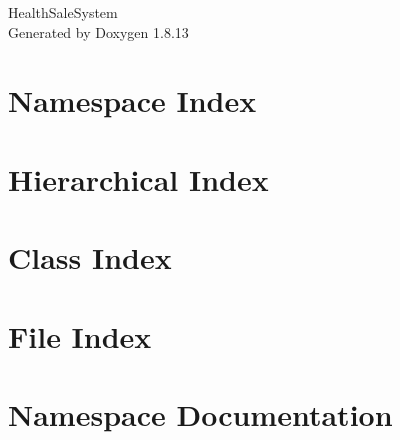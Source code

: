 \documentclass[twoside]{book}
\newcommand{\+}{\discretionary{\mbox{\scriptsize$\hookleftarrow$}}{}{}}
\newcommand{\clearemptydoublepage}{%
  \newpage{\pagestyle{empty}\cleardoublepage}%
}
\begin{document}
\hypersetup{pageanchor=false,
             bookmarksnumbered=true,
             pdfencoding=unicode
            }
\begin{titlepage}
\vspace*{7cm}
\begin{center}%
{\Large Health\+Sale\+System }\\
\vspace*{1cm}
{\large Generated by Doxygen 1.8.13}\\
\end{center}
\end{titlepage}
\clearemptydoublepage
{}
\tableofcontents
\clearemptydoublepage
{}
\hypersetup{pageanchor=true}

\chapter{Namespace Index}

\chapter{Hierarchical Index}

\chapter{Class Index}

\chapter{File Index}

\chapter{Namespace Documentation}

\end{document}
